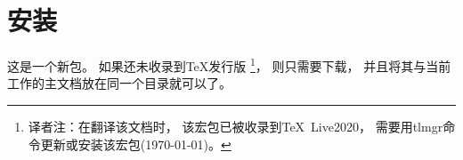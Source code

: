 
\section{安装}
\label{installation}

这是一个新包。
如果还未收录到\TeX{}发行版
\footnote{译者注：在翻译该文档时，
该宏包已被收录到\TeX\ Live2020，
需要用tlmgr命令更新或安装该宏包(\today)。}，
则只需要下载，
并且将其与当前工作的主文档放在同一个目录就可以了。
